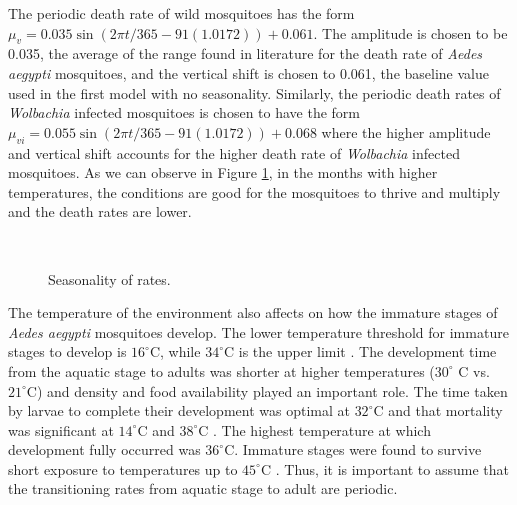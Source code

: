 \documentclass{ws-rv9x6}
\begin{document}
The periodic death rate of wild mosquitoes has the form $\mu_v=0.035\sin\left(2\pi t/365-91(1.0172)\right)+0.061$. The amplitude is chosen to be 0.035, the average of the range found in literature for the death rate of \textit{Aedes aegypti} mosquitoes, and the vertical shift is chosen to 0.061, the baseline value used in the first model with no seasonality. Similarly, the periodic death rates of \textit{Wolbachia} infected mosquitoes is chosen to have the form $\mu_{vi}=0.055\sin\left(2\pi t/365-91(1.0172)\right)+0.068$ where the higher amplitude and vertical shift accounts for the higher death rate of \textit{Wolbachia} infected mosquitoes. As we can observe in Figure \ref{fig:birthdeath}, in the months with higher temperatures, the conditions are good for the mosquitoes to thrive and multiply and the death rates are lower. 


\begin{figure}[H]
    \centering
     \
     \ 
    
    \caption{Seasonality of rates.}
\label{fig:birthdeath}
\end{figure}

The temperature of the environment also affects on how the immature stages of \textit{Aedes aegypti} mosquitoes develop. The lower temperature threshold for immature stages to develop is $16^{\circ}$C, while $34^{\circ}$C is the upper limit \cite{christophers1960aedes}. The development time from the aquatic stage to adults was shorter at higher temperatures ($30^{\circ}$ C vs. $21^{\circ}$C) and density and food availability played an important role.  The time taken by larvae to complete their development was optimal at $32^{\circ}$C and that mortality was significant at $14^{\circ}$C and $38^{\circ}$C \cite{bar1958effect}. 
The highest temperature at which development fully occurred was $36 ^{\circ}$C. Immature stages were found to survive short exposure to temperatures up to $45^{\circ}$C \cite{bar1957effect}. Thus, it is important to assume that the transitioning rates from aquatic stage to adult are periodic. 
\end{document}
